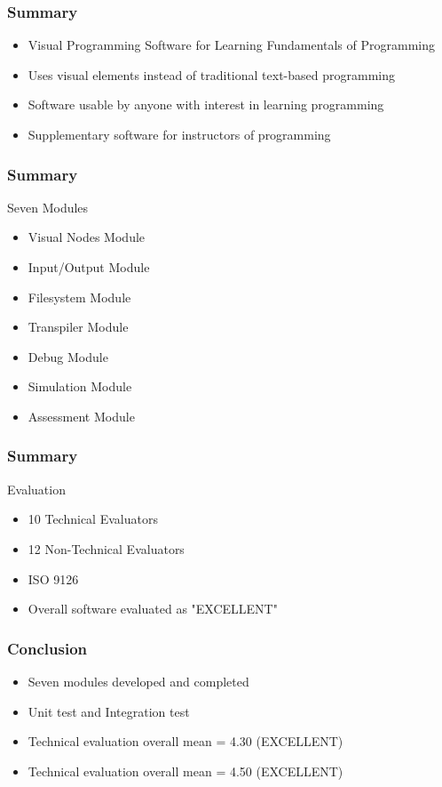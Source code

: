 \documentclass[handout]{beamer}
\begin{document}
\begin{frame}
	\frametitle{Summary}
	\begin{itemize}
		\item<1-> Visual Programming Software for Learning Fundamentals of Programming
		\item<2-> Uses visual elements instead of traditional text-based programming
		\item<3-> Software usable by anyone with interest in learning programming
		\item<4-> Supplementary software for instructors of programming
	\end{itemize}
\end{frame}

\begin{frame}
	\frametitle{Summary}
	\begin{block}{Seven Modules}
		\begin{itemize}
			\item<1-> Visual Nodes Module
			\item<2-> Input/Output Module
			\item<3-> Filesystem Module
			\item<4-> Transpiler Module
			\item<5-> Debug Module
			\item<6-> Simulation Module
			\item<7-> Assessment Module
		\end{itemize}
	\end{block}
\end{frame}

\begin{frame}
	\frametitle{Summary}
	\begin{block}{Evaluation}
		\begin{itemize}
			\item<1-> 10 Technical Evaluators
			\item<2-> 12 Non-Technical Evaluators
			\item<3-> ISO 9126
			\item<4-> Overall software evaluated as "EXCELLENT"
		\end{itemize}
	\end{block}
\end{frame}

\begin{frame}
	\frametitle{Conclusion}
	\begin{itemize}
		\item<1-> Seven modules developed and completed
		\item<2-> Unit test and Integration test
		\item<3-> Technical evaluation overall mean = 4.30 (EXCELLENT)
		\item<4-> Technical evaluation overall mean = 4.50 (EXCELLENT)
	\end{itemize}
\end{frame}
\end{document}
